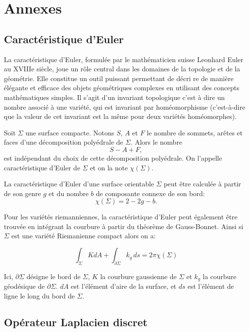 \chapter*{Annexes}
\label{chap:annexes}

\section{Caractéristique d'Euler}

La caractéristique d'Euler, formulée par le mathématicien suisse Leonhard Euler au XVIIIe siècle, joue un rôle central dans les domaines de la topologie et de la géométrie. Elle constitue un outil puissant permettant de décri re de manière élégante et efficace des objets géométriques complexes en utilisant des concepts mathématiques simples. Il s'agit d'un invariant topologique c'est à dire un nombre associé à une variété, qui est invariant par homéomorphisme (c’est-à-dire que la valeur de cet invariant est la même pour deux variétés homéomorphes).

\begin{definition}
Soit $\Sigma$ une surface compacte. Notons $S$, $A$ et $F$ le nombre de sommets, arêtes et faces d'une décomposition polyédrale de $\Sigma$. Alors le nombre
$$
S-A+F,
$$
est indépendant du choix de cette décomposition polyédrale. On l’appelle caractéristique d’Euler de $\Sigma$ et on la note $\chi(\Sigma)$.
\end{definition}

La caractéristique d'Euler d'une surface orientable $\Sigma$ peut être calculée à partir de son genre $g$ et du nombre $b$ de composante connexe de son bord:
$$
\chi(\Sigma) = 2-2g-b.
$$

Pour les variétés riemanniennes, la caractéristique d'Euler peut également être trouvée en intégrant la courbure à partir du théorème de Gauss-Bonnet. Ainsi si $\Sigma$ est une variété Riemanienne compact alors on a:

$$
\displaystyle\int_\Sigma KdA+\int_{\partial\Sigma} k_{g}\,ds=2\pi \chi (\Sigma)
$$

Ici, $\partial\Sigma$ désigne le bord de $\Sigma$, $K$ la courbure gaussienne de $\Sigma$ et $k_g$ la courbure géodésique de $\partial\Sigma$. $dA$ est l'élément d'aire de la surface, et $ds$ est l'élément de ligne le long du bord de $\Sigma$.


\section{Opérateur Laplacien discret}

